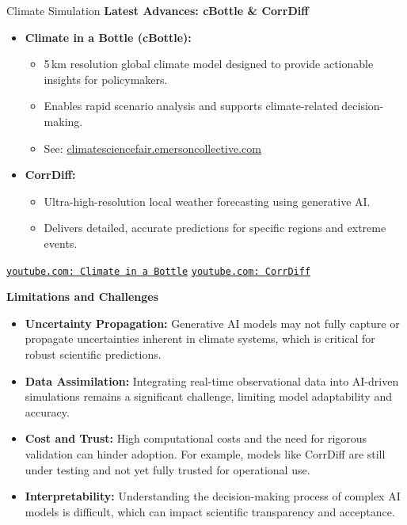 \begin{frame}[allowframebreaks]{Climate Simulation}
    \framebreak
    \textbf{Latest Advances: cBottle \& CorrDiff}

    \begin{itemize}
        \item \textbf{Climate in a Bottle (cBottle):}
        \begin{itemize}
            \item 5\,km resolution global climate model designed to provide actionable insights for policymakers.
            \item Enables rapid scenario analysis and supports climate-related decision-making.
            \item See: \href{https://climatesciencefair.emersoncollective.com}{climatesciencefair.emersoncollective.com}
        \end{itemize}
        \item \textbf{CorrDiff:}
        \begin{itemize}
            \item Ultra-high-resolution local weather forecasting using generative AI.
            \item Delivers detailed, accurate predictions for specific regions and extreme events.
        \end{itemize}
    \end{itemize}

    \begin{center}
        \href{https://www.youtube.com/results?search_query=climate+in+a+bottle}{\texttt{youtube.com: Climate in a Bottle}}
        \hspace{1cm}
        \href{https://www.youtube.com/results?search_query=CorrDiff}{\texttt{youtube.com: CorrDiff}}
    \end{center}

    \framebreak

    \textbf{Limitations and Challenges}

    \begin{itemize}
        \item \textbf{Uncertainty Propagation:} Generative AI models may not fully capture or propagate uncertainties inherent in climate systems, which is critical for robust scientific predictions.
        \item \textbf{Data Assimilation:} Integrating real-time observational data into AI-driven simulations remains a significant challenge, limiting model adaptability and accuracy.
        \item \textbf{Cost and Trust:} High computational costs and the need for rigorous validation can hinder adoption. For example, models like CorrDiff are still under testing and not yet fully trusted for operational use.
        \item \textbf{Interpretability:} Understanding the decision-making process of complex AI models is difficult, which can impact scientific transparency and acceptance.
    \end{itemize}

\end{frame}